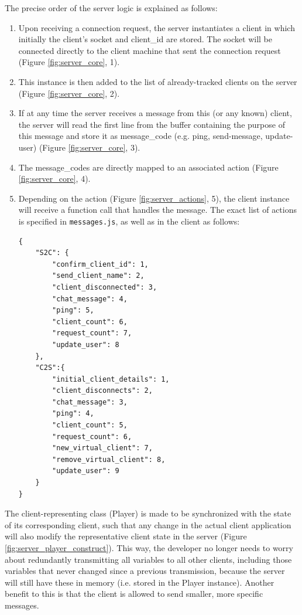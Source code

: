 \documentclass[bsc, 12pt, twoside, singlespacing, parskip, abbrevs, notimes, normalheadings, logo]{styles/infthesis}
\begin{document}
\vspace{2em}
The precise order of the server logic is explained as follows:
\begin{enumerate}
\item Upon receiving a connection request, the server instantiates a client in which initially the client's socket and client\_id are stored. The socket will be connected directly to the client machine that sent the connection request (Figure \ref{fig:server_core}, 1).\\
\item This instance is then added to the list of already-tracked clients on the server (Figure \ref{fig:server_core}, 2).
\item If at any time the server receives a message from this (or any known) client, the server will read the first line from the buffer containing the purpose of this message and store it as message\_code (e.g. ping, send-message, update-user) (Figure \ref{fig:server_core}, 3).
\item The message\_codes are directly mapped to an associated action (Figure \ref{fig:server_core}, 4).
\item Depending on the action (Figure \ref{fig:server_actions}, 5), the client instance will receive a function call that handles the message. The exact list of actions is specified in \texttt{messages.js}, as well as in the client as follows:
\begin{verbatim}
{
	"S2C": {
		"confirm_client_id": 1,
		"send_client_name": 2,
		"client_disconnected": 3,
		"chat_message": 4,
		"ping": 5,
		"client_count": 6,
		"request_count": 7,
		"update_user": 8
	},
	"C2S":{
		"initial_client_details": 1,
		"client_disconnects": 2,
		"chat_message": 3,
		"ping": 4,
		"client_count": 5,
		"request_count": 6,
		"new_virtual_client": 7,
		"remove_virtual_client": 8,
		"update_user": 9
	}
}
\end{verbatim}

\end{enumerate}



The client-representing class (Player) is made to be synchronized with the state of its corresponding client, such that any change in the actual client application will also modify the representative client state in the server (Figure \ref{fig:server_player_construct}). This way, the developer no longer needs to worry about redundantly transmitting all variables to all other clients, including those variables that never changed since a previous transmission, because the server will still have these in memory (i.e. stored in the Player instance). Another benefit to this is that the client is allowed to send smaller, more specific messages.
\end{document}
